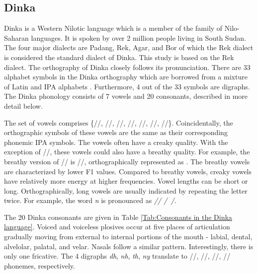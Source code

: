 \documentclass[a4paper]{article}
\begin{document}
\subsection{Dinka} \vspace{-1mm}
Dinka is a Western Nilotic language which is a member of the family of Nilo-Saharan languages. It is spoken by over 2 million people living in South Sudan. The four major dialects are Padang, Rek, Agar, and Bor of which the Rek dialect is considered the standard dialect of Dinka. This study is based on the Rek dialect. The orthography of Dinka closely follows its pronunciation. There are 33 alphabet symbols in the Dinka orthography which are borrowed from a mixture of Latin and IPA alphabets \cite{DinkaOmniglot}. Furthermore, 4 out of the 33 symbols are digraphs. The Dinka phonology \cite{Remijsen-LuanyjangDinka} consists of 7 vowels and 20 consonants, described in more detail below.

The set of vowels comprises \{//, //, //, //, //, //, //\}. Coincidentally, the orthographic symbols of these vowels are the same as their corresponding phonemic IPA symbols. The vowels often have a creaky quality. With the exception of //, these vowels could also have a breathy quality. For example, the breathy version of // is //, orthographically represented as . The breathy vowels are characterized by lower F1 values. Compared to breathy vowels, creaky vowels have relatively more energy at higher frequencies. Vowel lengths can be short or long. Orthographically, long vowels are usually indicated by repeating the letter twice. For example, the word \emph{n} is pronounced as \emph{// /~/}.

The 20 Dinka consonants are given in Table \ref{Tab:Consonants in the Dinka language}. Voiced and voiceless plosives occur at five places of articulation gradually moving from external to internal portions of the mouth - labial, dental, alvelolar, palatal, and velar. Nasals follow a similar pattern. Interestingly, there is only one fricative. The 4 digraphs \emph{dh}, \emph{nh}, \emph{th}, \emph{ny} translate to /\textipa{\|[d}/, /\textipa{\|[n}/, /\textipa{\|[t}/, /\textltailn/ phonemes, respectively.
\end{document}
